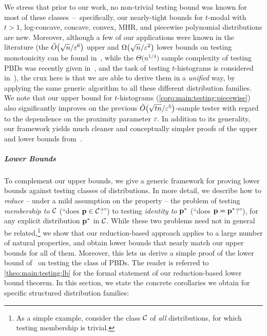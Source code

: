 We stress that prior to our work, no non-trivial testing bound was known for most of these classes~--~specifically, our nearly-tight bounds for
$t$-modal with $t>1$, log-concave, concave, convex, MHR, and piecewise polynomial distributions are new. Moreover, although a few of our applications 
were known in the literature (the $\tildeO{\sqrt{n}/\eps^6}$ upper and $\bigOmega{\sqrt{n}/\eps^2}$ lower bounds on testing monotonicity can be found in~\cite{BKR:04}, while the $\Theta\big({n^{1/4}}\big)$ sample complexity of testing PBDs was recently given\footnotemark{} in~\cite{AD:15}, and the task of testing $t$-histograms is considered in~\cite{ILR:12}), the crux here is that we are able to derive them in a \emph{unified} way, by applying the same generic algorithm to all these different distribution families. 
We note that our upper bound for $t$-histograms (\cref{coro:main:testing:piecewise}) also significantly improves on the previous $\tildeO{\sqrt{tn}/\eps^5}$-sample tester with regard to the dependence on the proximity parameter $\varepsilon$. In addition to its generality, our framework yields much cleaner and conceptually simpler proofs of the upper and lower bounds from~\cite{AD:15}.

\subparagraph{Lower Bounds} To complement our upper bounds, we give a generic framework for proving lower bounds against testing classes of distributions. In more detail, we describe how to {\em reduce} -- under a mild assumption on the property \class{} -- the problem of testing \emph{membership to $\mathcal{C}$} (``does $\mathbf{p}\in\mathcal{C}$?'') to testing \emph{identity to $\mathbf{p}^\ast$} (``does $\mathbf{p}=\mathbf{p}^\ast$?''), for any explicit distribution $\mathbf{p}^\ast$ in $\mathcal{C}$. While these two problems need not in general be related,\footnote{As a simple example, consider the class $\mathcal{C}$ of \emph{all} distributions, for which testing membership is trivial.} we show that our reduction-based approach applies to a large number of natural properties, and obtain lower bounds that nearly match our upper bounds for all of them. 
Moreover, this lets us derive a 
simple proof of the lower bound of~\cite{AD:15} on testing the class of PBDs.
The reader is referred to \cref{theo:main:testing:lb} for the formal statement of our reduction-based lower bound theorem.
In this section, we state the concrete corollaries we obtain for specific structured distribution families:

